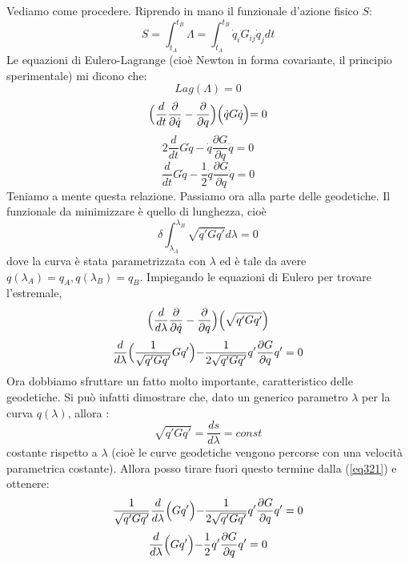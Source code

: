 \documentclass[a4paper,openany]{article}
\begin{document}
	Vediamo come procedere. Riprendo in mano il funzionale d'azione fisico $S$:
	$$ 
	S = \int_{t_A}^{t_B}\Lambda = \int_{t_A}^{t_B}\dot{q}_iG_{ij}\dot{q}_j dt
	$$
	Le equazioni di Eulero-Lagrange (cioè Newton in forma covariante, il principio sperimentale) mi dicono che:
	\begin{equation}\label{key}
		Lag(\Lambda) = 0
	\end{equation}
\begin{equation}\label{key}
	\Bigl(\dfrac{d}{dt}\dfrac{\partial}{\partial \dot{q}}-\dfrac{\partial}{\partial q}\Bigl)\Bigl(\dot{q}G\dot{q}\Bigl) = 0
\end{equation}
\begin{equation}\label{eq123}
	2\dfrac{d}{dt}G\dot{q}-\dot{q}\dfrac{\partial G}{\partial q}\dot{q} =0
\end{equation}
\begin{equation}\label{eq124}
	\dfrac{d}{dt}G\dot{q}-\dfrac{1}{2}\dot{q}\dfrac{\partial G}{\partial q}\dot{q} =0
\end{equation}
Teniamo a mente questa relazione. Passiamo ora alla parte delle geodetiche. Il funzionale da minimizzare è quello di lunghezza, cioè
$$
\delta \int_{\lambda_A}^{\lambda_B}\sqrt{q'Gq'}d\lambda  = 0
$$
dove la curva è stata parametrizzata con $\lambda$ ed è tale da avere $q(\lambda_A) = q_A, q(\lambda_B) = q_B$. Impiegando le equazioni di Eulero per trovare l'estremale,
\begin{equation}\label{key}
	\Bigl(\dfrac{d}{d\lambda}\dfrac{\partial}{\partial \dot{q}}-\dfrac{\partial}{\partial q}\Bigl)\Bigl(\sqrt{q'Gq'}\Bigl)
\end{equation}
\begin{equation}\label{eq321}
	\dfrac{d}{d\lambda}\Bigl(\dfrac{1}{\sqrt{q'Gq'}}Gq'\Bigl)-\dfrac{1}{2\sqrt{q'Gq'}}q'\dfrac{\partial G}{\partial q}q' =0
\end{equation}
Ora dobbiamo sfruttare un fatto molto importante, caratteristico delle geodetiche. Si può infatti dimostrare che, dato un generico parametro $\lambda$ per la curva $q(\lambda)$, allora :
$$
\sqrt{q'Gq'} = \dfrac{ds}{d\lambda} = const
$$
costante rispetto a $\lambda$ (cioè le curve geodetiche vengono percorse con una velocità parametrica costante). Allora posso tirare fuori questo termine dalla (\ref{eq321}) e ottenere:
\begin{equation}\label{key}
		\dfrac{1}{\sqrt{q'Gq'}}\dfrac{d}{d\lambda}\Bigl(Gq'\Bigl)-\dfrac{1}{2\sqrt{q'Gq'}}q'\dfrac{\partial G}{\partial q}q' =0
\end{equation}
\begin{equation}\label{key}\dfrac{d}{d\lambda}\Bigl(Gq'\Bigl)-\dfrac{1}{2}q'\dfrac{\partial G}{\partial q}q' =0
\end{equation}
\end{document}
